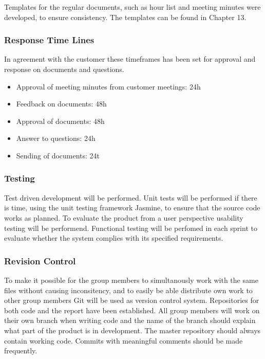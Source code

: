 Templates for the regular documents, such as hour list and meeting minutes were developed, to ensure consistency. The templates can be found in Chapter 13.

\subsubsection{Response Time Lines}

In agreement with the customer these timeframes has been set for approval and response on documents and questions.

\begin{itemize}
	\item Approval of meeting minutes from customer meetings: 24h
	\item Feedback on documents: 48h
	\item Approval of documents: 48h
	\item Answer to questions: 24h
	\item Sending of documents: 24t
\end{itemize}

\subsubsection{Testing}

Test driven development will be performed. Unit tests will be performed if there is time, using the unit testing framework Jasmine, to ensure that the source code works as planned. To evaluate the product from a user perspective usability testing will be performend. Functional testing will be perfomed in each sprint to evaluate whether the system complies with its specified requirements.

\subsubsection{Revision Control}

To make it possible for the group members to simultanously work with the same files without causing inconsitency, and to easily be able distribute own work to other group members Git will be used as version control system. Repositories for both code and the report have been established. All group members will work on their own branch when writing code and the name of the branch should explain what part of the product is in development. The master repository should always contain working code. Commits with meaningful comments should be made frequently.


